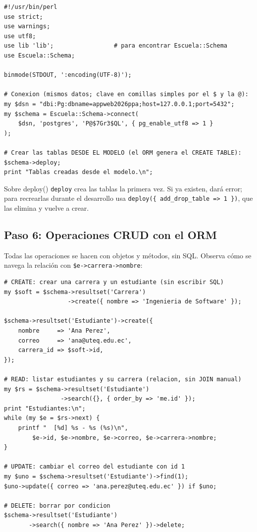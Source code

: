 \documentclass[11pt]{article}
\begin{document}
\begin{cajacodigo}
\begin{lstlisting}[style=perl]
#!/usr/bin/perl
use strict;
use warnings;
use utf8;
use lib 'lib';                 # para encontrar Escuela::Schema
use Escuela::Schema;

binmode(STDOUT, ':encoding(UTF-8)');

# Conexion (mismos datos; clave en comillas simples por el $ y la @):
my $dsn = "dbi:Pg:dbname=appweb2026ppa;host=127.0.0.1;port=5432";
my $schema = Escuela::Schema->connect(
    $dsn, 'postgres', 'P@$7Gr3$QL', { pg_enable_utf8 => 1 }
);

# Crear las tablas DESDE EL MODELO (el ORM genera el CREATE TABLE):
$schema->deploy;
print "Tablas creadas desde el modelo.\n";
\end{lstlisting}
\end{cajacodigo}
\vspace{2pt}
\begin{cajawarn}{Sobre deploy()}
\texttt{deploy} crea las tablas la primera vez. Si ya existen, dará error; para recrearlas durante el desarrollo usa \texttt{deploy(\{ add\_drop\_table =\textgreater{} 1 \})}, que las elimina y vuelve a crear.\par
\end{cajawarn}
\subsection{Paso 6: Operaciones CRUD con el ORM}
Todas las operaciones se hacen con objetos y métodos, sin SQL. Observa cómo se navega la relación con \texttt{\$e-\textgreater{}carrera-\textgreater{}nombre}:

\begin{cajacodigo}
\begin{lstlisting}[style=perl]
# CREATE: crear una carrera y un estudiante (sin escribir SQL)
my $soft = $schema->resultset('Carrera')
                  ->create({ nombre => 'Ingenieria de Software' });

$schema->resultset('Estudiante')->create({
    nombre     => 'Ana Perez',
    correo     => 'ana@uteq.edu.ec',
    carrera_id => $soft->id,
});

# READ: listar estudiantes y su carrera (relacion, sin JOIN manual)
my $rs = $schema->resultset('Estudiante')
                ->search({}, { order_by => 'me.id' });
print "Estudiantes:\n";
while (my $e = $rs->next) {
    printf "  [%d] %s - %s (%s)\n",
        $e->id, $e->nombre, $e->correo, $e->carrera->nombre;
}

# UPDATE: cambiar el correo del estudiante con id 1
my $uno = $schema->resultset('Estudiante')->find(1);
$uno->update({ correo => 'ana.perez@uteq.edu.ec' }) if $uno;

# DELETE: borrar por condicion
$schema->resultset('Estudiante')
       ->search({ nombre => 'Ana Perez' })->delete;
\end{lstlisting}
\end{cajacodigo}
\vspace{2pt}
\end{document}
